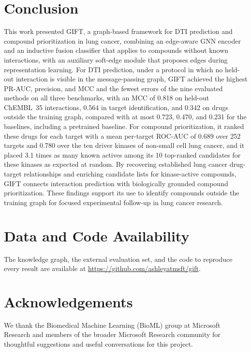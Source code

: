 \documentclass[10pt,letterpaper]{article}
\newcommand{\repourl}{\url{https://github.com/ashleyatmsft/gift}}
\begin{document}
\section{Conclusion}
\label{sec:conclusion}
This work presented GIFT, a graph-based framework for DTI prediction and compound prioritization in lung cancer, combining an edge-aware GNN encoder and an inductive fusion classifier that applies to compounds without known interactions, with an auxiliary soft-edge module that proposes edges during representation learning. For DTI prediction, under a protocol in which no held-out interaction is visible in the message-passing graph, GIFT achieved the highest PR-AUC, precision, and MCC and the fewest errors of the nine evaluated methods on all three benchmarks, with an MCC of 0.818 on held-out ChEMBL~35 interactions, 0.564 in target identification, and 0.342 on drugs outside the training graph, compared with at most 0.723, 0.470, and 0.231 for the baselines, including a pretrained baseline. For compound prioritization, it ranked these drugs for each target with a mean per-target ROC-AUC of 0.689 over 252 targets and 0.780 over the ten driver kinases of non-small cell lung cancer, and it placed 3.1 times as many known actives among its 10 top-ranked candidates for these kinases as expected at random.
By recovering established lung cancer drug-target relationships and enriching candidate lists for kinase-active compounds, GIFT connects interaction prediction with biologically grounded compound prioritization. These findings support its use to identify compounds outside the training graph for focused experimental follow-up in lung cancer research.

\section*{Data and Code Availability}
The knowledge graph, the external evaluation set, and the code to reproduce every result are available at \repourl.

\section*{Acknowledgements}
We thank the Biomedical Machine Learning (BioML) group at Microsoft Research and members of the broader Microsoft Research community for thoughtful suggestions and useful conversations for this project.



\end{document}
